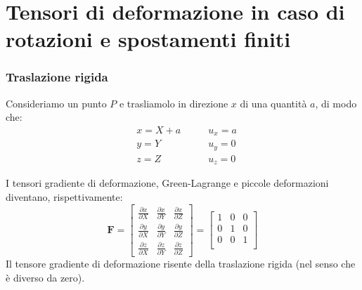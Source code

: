\section{Tensori di deformazione in caso di rotazioni e spostamenti finiti}

\subsubsection*{Traslazione rigida}

Consideriamo un punto $P$ e trasliamolo in direzione $x$ di una quantità $a$, di modo che:
\begin{align*}
    &x = X + a \quad\quad &u_x = a\\
    &y = Y &u_y = 0\\
    &z = Z &u_z = 0
\end{align*}

I tensori gradiente di deformazione, Green-Lagrange e piccole deformazioni diventano, rispettivamente: 
\begin{equation*}
\boldsymbol{F} = 
\begin{bmatrix}
\frac{\partial x}{\partial X} & \frac{\partial x}{\partial Y} & \frac{\partial x}{\partial Z} \\
\frac{\partial y}{\partial X} & \frac{\partial y}{\partial Y} & \frac{\partial y}{\partial Z} \\
\frac{\partial z}{\partial X} & \frac{\partial z}{\partial Y} & \frac{\partial z}{\partial Z}
\end{bmatrix} = 
\begin{bmatrix}
   1 & 0 & 0 \\
   0 & 1 & 0 \\
   0 & 0 & 1 \\
\end{bmatrix}
\end{equation*}
Il tensore gradiente di deformazione risente della traslazione rigida (nel senso che è diverso da zero).

